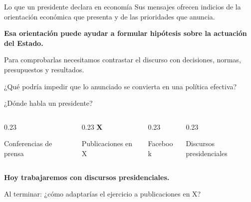 \begin{frame}[label=orientacion-declarada]{Lo que un presidente declara en economía}
  Sus mensajes ofrecen indicios de la orientación económica que presenta y de las prioridades que anuncia.\par
  \vspace{0.45cm}
  \textbf{Esa orientación puede ayudar a formular hipótesis sobre la actuación del Estado.}\par
  \vspace{0.4cm}
  Para comprobarlas necesitamos contrastar el discurso con decisiones, normas, presupuestos y resultados.\par
  \vspace{0.25cm}
  ¿Qué podría impedir que lo anunciado se convierta en una política efectiva?
\end{frame}

\begin{frame}[label=canales-presidente]{¿Dónde habla un presidente?}
  \begin{columns}[T,onlytextwidth]
    \begin{column}{0.23\textwidth}\centering
      {\color{peacockblue}\fontsize{34}{40}\selectfont\faMicrophone}\par
      \vspace{0.25cm}Conferencias de prensa
    \end{column}
    \begin{column}{0.23\textwidth}\centering
      {\fontsize{34}{40}\selectfont\bfseries X}\par
      \vspace{0.25cm}Publicaciones en X
    \end{column}
    \begin{column}{0.23\textwidth}\centering
      {\color{peacockblue}\fontsize{34}{40}\selectfont\faFacebookF}\par
      \vspace{0.25cm}Facebook
    \end{column}
    \begin{column}{0.23\textwidth}\centering
      {\color{UWMathPinkL4}\fontsize{34}{40}\selectfont\faFile}\par
      \vspace{0.25cm}Discursos presidenciales
    \end{column}
  \end{columns}
  \vspace{0.7cm}
  \textbf{Hoy trabajaremos con discursos presidenciales.}\par
  \vspace{0.25cm}
  Al terminar: ¿cómo adaptarías el ejercicio a publicaciones en X?
\end{frame}

